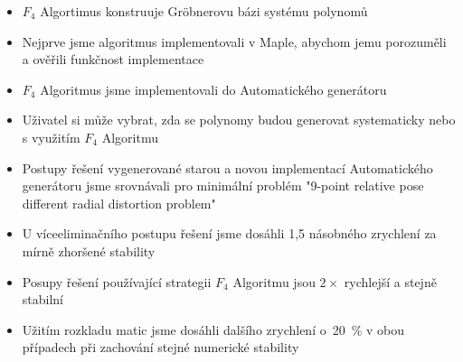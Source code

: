 \documentclass[cmpiitalkstyle, 25pt]{cmptalk}
\begin{document}
\begin{cmptalkslide}[$F_4$ Algoritmus]
  \begin{itemize}
    \item $F_4$ Algortimus \cite{F4} konstruuje Gr\"obnerovu bázi systému polynomů
    \item Nejprve jsme algoritmus implementovali v Maple, abychom jemu porozuměli a ověřili funkčnost implementace
    \item $F_4$ Algoritmus jsme implementovali do Automatického generátoru \cite{AutoGen}
    \item Uživatel si může vybrat, zda se polynomy budou generovat systematicky nebo s využitím $F_4$ Algoritmu
  \end{itemize}
\end{cmptalkslide}


\begin{cmptalkslide}[Experimenty]
  \begin{itemize}
    \item Postupy řešení vygenerované starou a novou implementací Automatického generátoru jsme srovnávali pro minimální problém "9-point relative pose different radial distortion problem" \cite{9pt}
    \item U víceeliminačního postupu řešení jsme dosáhli 1,5 násobného zrychlení za mírně zhoršené stability
    \item Posupy řešení používající strategii $F_4$ Algoritmu \cite{F4} jsou $2\times$ rychlejší a stejně stabilní
    \item Užitím rozkladu matic jsme dosáhli dalšího zrychlení o~20~\% v obou případech při zachování stejné numerické stability
  \end{itemize}
\end{cmptalkslide}
\end{document}
